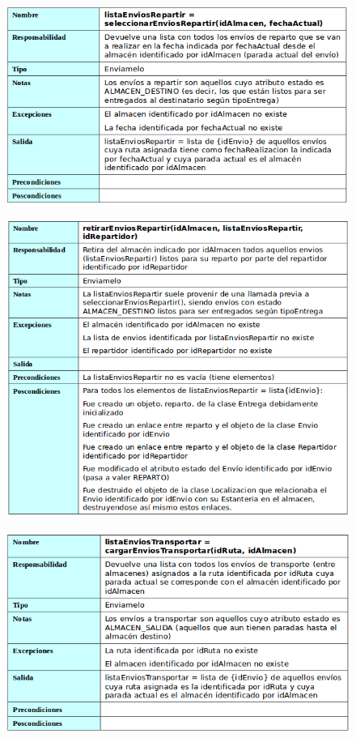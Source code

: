 \begin{figure}[H]
	\centering
	\includegraphics[width=16cm]{12}
\end{figure}
\begin{figure}[H]
	\centering
	\includegraphics[width=16cm]{13}
\end{figure}
\begin{figure}[H]
	\centering
	\includegraphics[width=16cm]{14}
\end{figure}
